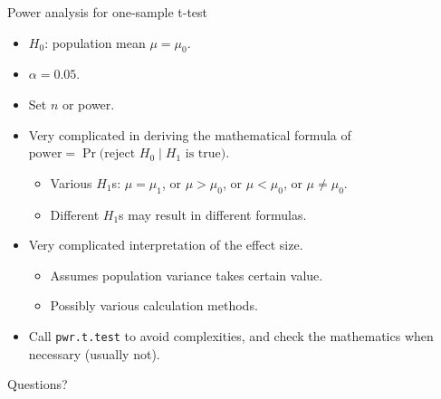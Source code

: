 \documentclass[12pt, t, xcolor=dvipsnames]{beamer}
\newcommand{\code}[1]{\colorbox{codegray}{\textcolor{black!95}{\texttt{#1}}}}
\begin{document}
\begin{frame}{Power analysis for one-sample t-test}
\begin{itemize}
  \item $H_0$: population mean $\mu = \mu_0$.
  \item $\alpha = 0.05$.
  \item Set $n$ or power.
  \item Very complicated in deriving the mathematical formula of $\text{power} = \Pr {\big (}{\text{reject }}H_{0}\mid H_{1}{\text{ is true}}{\big )}$. 
  \begin{itemize}
    \item Various $H_1$s: $\mu = \mu_1$, or $\mu > \mu_0$, or $\mu < \mu_0$, or $\mu \neq \mu_0$.
    \item Different $H_1$s may result in different formulas.
  \end{itemize}
  \item Very complicated interpretation of the effect size.
  \begin{itemize}
    \item Assumes population variance takes certain value.
    \item Possibly various calculation methods. 
  \end{itemize}
  
  \item Call \code{pwr.t.test} to avoid complexities, and check the mathematics when necessary (usually not). 
\end{itemize}

\end{frame}



\begin{frame}[c]
  \large{Questions?}
\end{frame}
\end{document}
